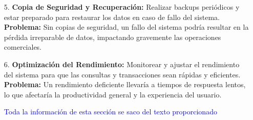 \begin{enumerate}
    \item[5.] \textbf{Copia de Seguridad y Recuperación:}
    Realizar backups periódicos y estar preparado para restaurar los datos en caso de fallo del sistema.\\
    \textbf{Problema:} Sin copias de seguridad, un fallo del sistema podría resultar en la pérdida irreparable de datos, impactando gravemente las operaciones comerciales. \\

    \item[6.] \textbf{Optimización del Rendimiento:}
    Monitorear y ajustar el rendimiento del sistema para que las consultas y transacciones sean rápidas y eficientes.\\
    \textbf{Problema:} Un rendimiento deficiente llevaría a tiempos de respuesta lentos, lo que afectaría la productividad general y la experiencia del usuario. 
    
    \textcolor{blue}{Toda la información de esta sección se saco del texto proporcionado\cite{Emagister}} \\
    
\end{enumerate}